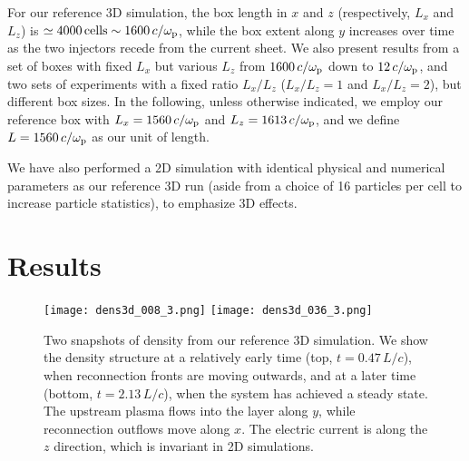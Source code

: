 \documentclass[twocolumn,twocolappendix]{aastex63}
\newcommand{\ls}{\textcolor{teal}}
\newcommand{\hz}{\textcolor{orange}}
\newcommand{\comp}{c/\omega_{\rm p}}
\begin{document}
For our reference 3D simulation, the box length in  $x$ and $z$ (respectively, $L_x$ and $L_z$) is $\simeq4000\,{\rm cells}\sim 1600\,\comp$, while the box extent along $y$ increases over time as the two injectors recede from the current sheet. %
We also present results from a set of boxes with fixed $L_x$ but various $L_z$ from $1600\,\comp$ down to $12\,\comp$, and two sets of experiments with a fixed ratio $L_x/L_z$ ($L_x/L_z = 1$ and $L_x/L_z = 2$), but different box sizes. In the following, unless otherwise indicated, we employ our reference box with $L_x=1560\,\comp$ and $L_z= 1613\,\comp$, and we define $L=1560\,\comp$ as our unit of length.

We have also performed a 2D simulation with identical physical and numerical parameters as our reference 3D run (aside from a choice of 16 particles per cell to increase particle statistics), to emphasize 3D effects.

\section{Results}\label{3}
\begin{figure}
    \texttt{[image: dens3d\_008\_3.png]}
    \texttt{[image: dens3d\_036\_3.png]}
    \caption{Two snapshots of density from our reference 3D simulation. We show the density structure at a relatively early time (top, $t = 0.47\, L/c$), when reconnection fronts are moving outwards, and at a later time (bottom, $t=2.13\, L/c$), when the system has achieved a steady state. The upstream plasma flows into the layer along $y$, while reconnection outflows move along $x$. The electric current is along the  $z$ direction, which is invariant in 2D simulations.
    }
    \label{fig:dens_3d}
\end{figure}
\end{document}
